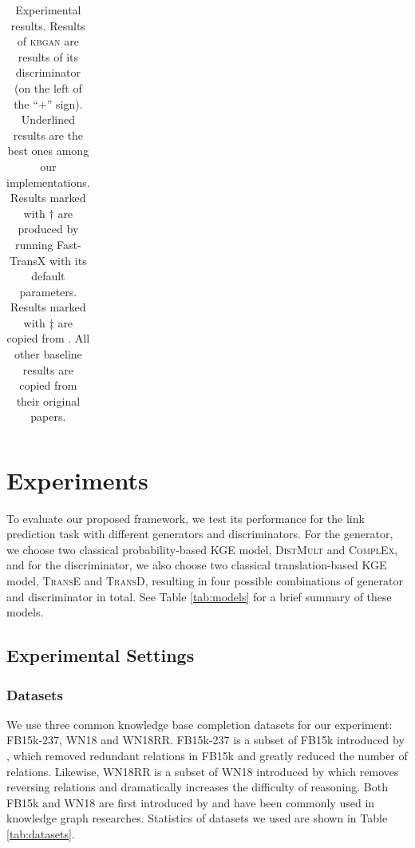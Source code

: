 \documentclass[11pt,a4paper]{article}
\begin{document}
\begin{table}[t]
\begin{tabular}{|l|cc|cc|cc|}
\end{tabular}
\caption{Experimental results. Results of \textsc{kbgan} are results of its discriminator (on the left of the ``+'' sign). Underlined results are the best ones among our implementations. Results marked with $\dag$ are produced by running Fast-TransX \cite{lin2015learning} with its default parameters. Results marked with $\ddag$ are copied from \cite{conve}. All other baseline results are copied from their original papers.}
\label{tab:results}
\end{table}

\section{Experiments}

To evaluate our proposed framework, we test its performance for the link prediction task with different generators and discriminators. For the generator, we choose two classical probability-based KGE model, \textsc{DistMult} and \textsc{ComplEx}, and for the discriminator,  we also choose two classical translation-based KGE model, \textsc{TransE} and \textsc{TransD}, resulting in four possible combinations of generator and discriminator in total. See Table \ref{tab:models} for a brief summary of these models.

\subsection{Experimental Settings}
\subsubsection{Datasets}
We use three common knowledge base completion datasets for our experiment: FB15k-237, WN18 and WN18RR. FB15k-237 is a subset of FB15k introduced by \cite{Toutanova2015}, which removed redundant relations in FB15k and greatly reduced the number of relations. Likewise, WN18RR is a subset of WN18 introduced by \cite{conve} which removes reversing relations and dramatically increases the difficulty of reasoning. Both FB15k and WN18 are first introduced by \cite{bordes2013translating} and have been commonly used in knowledge graph researches. Statistics of datasets we used are shown in Table \ref{tab:datasets}.
\end{document}
